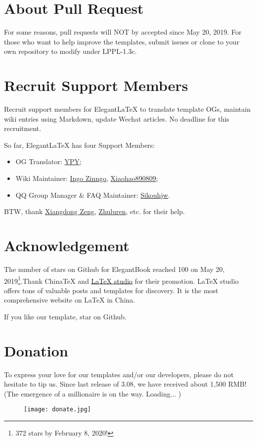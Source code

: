 \documentclass[11pt]{elegantbook}
\begin{document}
\section{About Pull Request}
For some reasons, pull requests will NOT by accepted since May 20, 2019. For those who want to help improve the templates, submit issues or clone to your own repository to modify under LPPL-1.3c.

\section{Recruit Support Members}
Recruit support members for Elegant\LaTeX{} to translate template OGs, maintain wiki entries using Markdown, update Wechat articles. No deadline for this recruitment.

So far, Elegant\LaTeX{} has four Support Members:
\begin{itemize}
  \item OG Translator: \href{https://github.com/peggy2006xzyz}{YPY};
  \item Wiki Maintainer: \href{https://github.com/izinngo}{Ingo Zinngo}, \href{https://github.com/xiaohao890809}{Xiaohao890809};
  \item QQ Group Manager \& FAQ Maintainer: \href{https://github.com/sikouhjw}{Sikouhjw}.
\end{itemize}

BTW, thank \href{https://github.com/stone-zeng}{Xiangdong Zeng}, \href{https://github.com/latexers}{Zhuluren}, etc. for their help.

\section{Acknowledgement}
The number of stars on Github for ElegantBook reached 100 on May 20, 2019\footnote{372 stars by February 8, 2020!}.Thank China\TeX{} and \href{http://www.latexstudio.net/}{\LaTeX{} studio} for their promotion. \LaTeX{} studio offers tons of valuable posts and templates for discovery. It is the most comprehensive website on \LaTeX{} in China. 

If you like our template, star on Github.

\section{Donation}
To express your love for our templates and/or our developers, please do not hesitate to tip us. Since last release of 3.08, we have received about 1,500 RMB! (The emergence of a millionaire is on the way. Loading... )
\begin{figure}[!htb]
  \centering
  \texttt{[image: donate.jpg]}
\end{figure}
\end{document}
